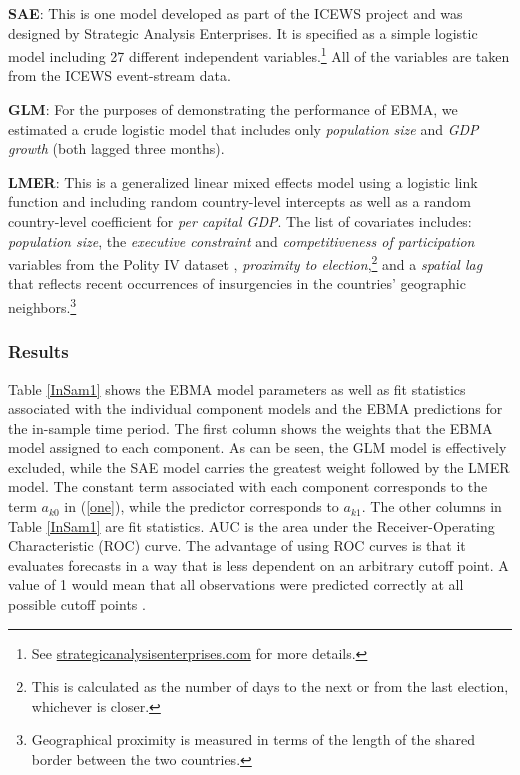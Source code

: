 \documentclass[pdftex,12pt,fullpage,oneside]{amsart}
\begin{document}
\begin{list}{}{\leftmargin=1em}
\item \textbf{SAE}: This is one model developed as part of the ICEWS
  project and was designed by Strategic Analysis Enterprises. It is
  specified as a simple logistic model including 27 different
  independent variables.\footnote{See
    \url{strategicanalysisenterprises.com} for more details.}  All of the variables are taken from the ICEWS
  event-stream data.
\item \textbf{GLM}: For the purposes of demonstrating the performance
  of EBMA, we estimated a crude logistic model that
  includes only \textit{population size} and \textit{GDP growth} (both
  lagged three months).
\item \textbf{LMER}: This is a generalized linear mixed effects model
  using a logistic link function and including random country-level
  intercepts as well as a random country-level coefficient for
  \textit{per capital GDP}.  The list of covariates includes:
  \textit{population size}, the \textit{executive constraint} and
  \textit{competitiveness of participation} variables from the Polity
  IV dataset \citep{PolityIV}, \textit{proximity to
    election},\footnote{This is calculated as the number of days to
    the next or from the last election, whichever is closer.} and a
  \textit{spatial lag} that reflects recent occurrences of
  insurgencies in the countries' geographic
  neighbors.\footnote{Geographical proximity is measured in terms of
    the length of the shared border between the two countries.}
\end{list}

\subsubsection{Results}

Table \ref{InSam1} shows the EBMA model parameters as well as fit
statistics associated with the individual component models and the
EBMA predictions for the in-sample time period. The first column shows
the weights that the EBMA model assigned to each component. As can be
seen, the GLM model is effectively excluded, while the SAE model
carries the greatest weight followed by the LMER model.  The constant
term associated with each component corresponds to the term $a_{k0}$
in (\ref{one}), while the predictor corresponds to $a_{k1}$.
The other columns in Table \ref{InSam1} are fit statistics.  AUC is
the area under the Receiver-Operating Characteristic (ROC) curve. The
advantage of using ROC curves is that it evaluates forecasts in a way
that is less dependent on an arbitrary cutoff point.  A value of 1
would mean that all observations were predicted correctly at all
possible cutoff points \citep{King:Zeng:2001}.
\end{document}

